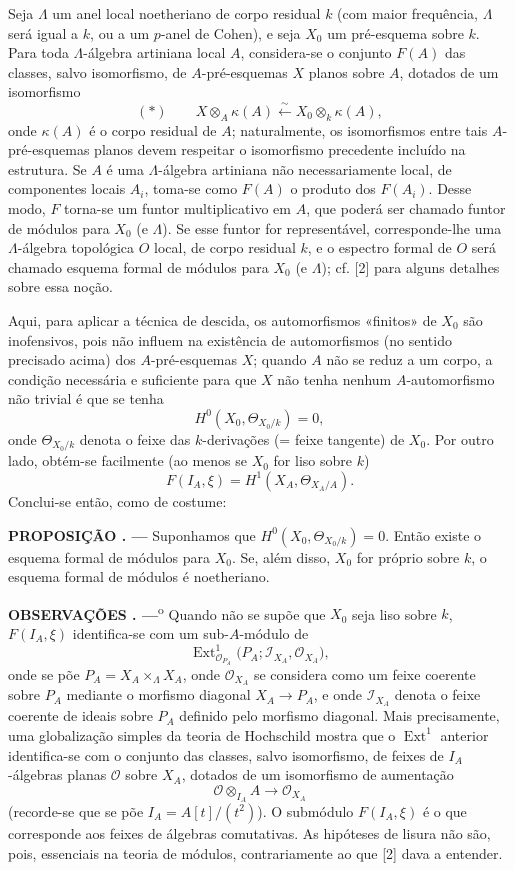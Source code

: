 \documentclass[11pt,twoside,openany]{book}
\numberwithin{equation}{section}
\newcommand{\src}[1]{%
  \phantomsection\hypertarget{src:#1}{}%
  \marginpar{\raggedleft\footnotesize\sffamily #1}%
}
\theoremstyle{plain}
\theoremstyle{definition}
\theoremstyle{remark}
\newcommand{\result}[2]{%
  \par\medskip\noindent\textbf{#1%
  \if\relax\detokenize{#2}\relax\else\space#2\fi. ---}\enspace
}
\newcommand{\FgaUnitKey}{frontmatter}
\renewcommand{\src}[1]{%
  \phantomsection\hypertarget{src:\FgaUnitKey:#1}{}%
  \marginpar{\raggedleft\footnotesize\sffamily #1}%
}
\begin{document}
Seja $\Lambda$ um anel local noetheriano de corpo residual $k$ (com maior
frequência, $\Lambda$ será igual a $k$, ou a um $p$-anel de Cohen), e seja
$X_0$ um pré-esquema sobre $k$. Para toda $\Lambda$-álgebra artiniana local $A$,
considera-se o conjunto $F(A)$ das classes, salvo isomorfismo, de
$A$-pré-esquemas $X$ planos sobre $A$, dotados de um isomorfismo
\[
  (*)\qquad
  X\otimes_A\kappa(A)\xleftarrow{\sim}
  X_0\otimes_k\kappa(A),
\]
onde $\kappa(A)$ é o corpo residual de $A$; naturalmente, os isomorfismos
entre tais $A$-pré-esquemas planos devem respeitar o isomorfismo precedente
incluído na estrutura. Se $A$ é uma $\Lambda$-álgebra artiniana não
necessariamente local, de componentes locais $A_i$, toma-se como $F(A)$ o
produto dos $F(A_i)$. Desse modo, $F$ torna-se um funtor
multiplicativo em $A$, que poderá ser chamado funtor de módulos para $X_0$ (e
$\Lambda$). Se esse funtor for representável, corresponde-lhe uma
$\Lambda$-álgebra topológica $O$ local, de corpo residual $k$, e o espectro
formal de $O$ será chamado esquema formal de módulos para $X_0$ (e $\Lambda$);
cf. [2] para alguns detalhes sobre essa noção.

Aqui, para aplicar a técnica de descida, os automorfismos «finitos» de $X_0$
são inofensivos, pois não influem na existência de automorfismos (no
sentido precisado acima) dos $A$-pré-esquemas $X$; quando $A$ não se
reduz a um corpo, a condição necessária e suficiente para que $X$ não tenha
nenhum $A$-automorfismo não trivial é que se tenha
\[
  H^0(X_0,\Theta_{X_0/k})=0,
\]
onde $\Theta_{X_0/k}$ denota o feixe das $k$-derivações (= feixe tangente)
de $X_0$. Por outro lado, obtém-se facilmente (ao menos se $X_0$ for liso
sobre $k$)
\[
  F(I_A,\xi)=H^1(X_A,\Theta_{X_A/A}).
\]
Conclui-se então, como de costume:

\src{386}
\result{PROPOSIÇÃO}{4.1} Suponhamos que
$H^0(X_0,\Theta_{X_0/k})=0$. Então existe o esquema formal de módulos para
$X_0$. Se, além disso, $X_0$ for próprio sobre $k$, o esquema formal de módulos é
noetheriano.

\result{OBSERVAÇÕES}{} 1\textsuperscript{o} Quando não se supõe que $X_0$ seja
liso sobre $k$, $F(I_A,\xi)$ identifica-se com um sub-$A$-módulo de
\[
  \operatorname{Ext}^1_{\mathcal O_{P_A}}
  \bigl(P_A;\mathcal I_{X_A},\mathcal O_{X_A}\bigr),
\]
onde se põe $P_A=X_A\times_\Lambda X_A$, onde $\mathcal O_{X_A}$ se
considera como um feixe coerente sobre $P_A$ mediante o morfismo diagonal
$X_A\longrightarrow P_A$, e onde $\mathcal I_{X_A}$ denota o feixe coerente
de ideais sobre $P_A$ definido pelo morfismo diagonal. Mais precisamente,
uma globalização simples da teoria de Hochschild mostra que o
$\operatorname{Ext}^1$ anterior identifica-se com o conjunto das classes,
salvo isomorfismo, de feixes de $I_A$-álgebras planas $\mathcal O$ sobre $X_A$,
dotados de um isomorfismo de aumentação
\[
  \mathcal O\otimes_{I_A}A\longrightarrow\mathcal O_{X_A}
\]
(recorde-se que se põe $I_A=A[t]/(t^2)$). O submódulo $F(I_A,\xi)$ é o
que corresponde aos feixes de álgebras comutativas. As hipóteses de lisura
não são, pois, essenciais na teoria de módulos, contrariamente ao que [2]
dava a entender.
\end{document}
